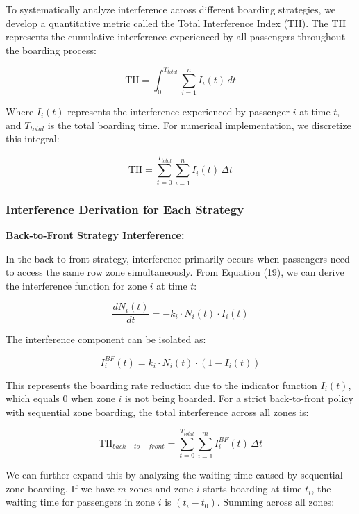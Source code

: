 To systematically analyze interference across different boarding strategies, we develop a quantitative metric called the Total Interference Index (TII). The TII represents the cumulative interference experienced by all passengers throughout the boarding process:

\begin{equation}
\text{TII} = \int_{0}^{T_{total}} \sum_{i=1}^{n} I_i(t) \, dt
\end{equation}

Where $I_i(t)$ represents the interference experienced by passenger $i$ at time $t$, and $T_{total}$ is the total boarding time. For numerical implementation, we discretize this integral:

\begin{equation}
\text{TII} = \sum_{t=0}^{T_{total}} \sum_{i=1}^{n} I_i(t) \, \Delta t
\end{equation}

\subsubsection{Interference Derivation for Each Strategy}

\textbf{Back-to-Front Strategy Interference:}

In the back-to-front strategy, interference primarily occurs when passengers need to access the same row zone simultaneously. From Equation (19), we can derive the interference function for zone $i$ at time $t$:

\begin{equation}
\frac{dN_i(t)}{dt} = -k_i \cdot N_i(t) \cdot I_i(t)
\end{equation}

The interference component can be isolated as:

\begin{equation}
I_i^{BF}(t) = k_i \cdot N_i(t) \cdot (1 - I_i(t))
\end{equation}

This represents the boarding rate reduction due to the indicator function $I_i(t)$, which equals 0 when zone $i$ is not being boarded. For a strict back-to-front policy with sequential zone boarding, the total interference across all zones is:

\begin{equation}
\text{TII}_{back-to-front} = \sum_{t=0}^{T_{total}} \sum_{i=1}^{m} I_i^{BF}(t) \, \Delta t
\end{equation}

We can further expand this by analyzing the waiting time caused by sequential zone boarding. If we have $m$ zones and zone $i$ starts boarding at time $t_i$, the waiting time for passengers in zone $i$ is $(t_i - t_0)$. Summing across all zones:

